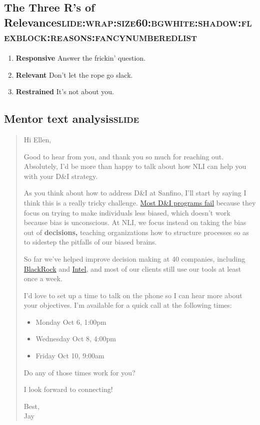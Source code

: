 \documentclass[12pt]{article}
\begin{document}
\subsection[The Three R's of Relevance]{The Three R's of Relevance\hfill{}\textsc{slide:wrap:size60:bgwhite:shadow:flexblock:reasons:fancynumberedlist}}
\label{sec:org24428f3}
\begin{enumerate}
\item \textbf{Responsive} Answer the frickin' question.
\item \textbf{Relevant} Don't let the rope go slack.
\item \textbf{Restrained} It's not about you.
\end{enumerate}

\subsection[Mentor text analysis]{Mentor text analysis\hfill{}\textsc{slide}}
\label{sec:org5559c08}
\begin{quote}
Hi Ellen,

Good to hear from you, and thank you so much for reaching out. Absolutely, I'd be more than happy to talk about how NLI can help you with your D\&I strategy.

As you think about how to address D\&I at Sanfino, I'll start by saying I think this is a really tricky challenge. \href{//hbr.org/2016/07/why-diversity-programs-fail}{Most D\&I programs fail} because they focus on trying to make individuals less biased, which doesn't work because bias is unconscious. At NLI, we focus instead on taking the bias out of \textbf{decisions,} teaching organizations how to structure processes so as to sidestep the pitfalls of our biased brains.

So far we've helped improve decision making at 40 companies, including \href{https://neuroleadership.com/portfolio-items/case-study-blackrock-breaking-bias/}{BlackRock} and \href{https://neuroleadership.com/portfolio-items/nli-transforms-intel-culture/}{Intel}, and most of our clients still use our tools at least once a week.

I'd love to set up a time to talk on the phone so I can hear more about your objectives. I'm available for a quick call at the following times:

\begin{itemize}
\item Monday Oct 6, 1:00pm
\item Wednesday Oct 8, 4:00pm
\item Friday Oct 10, 9:00am
\end{itemize}

Do any of those times work for you?

I look forward to connecting!

Best, \\
Jay
\end{quote}
\end{document}
